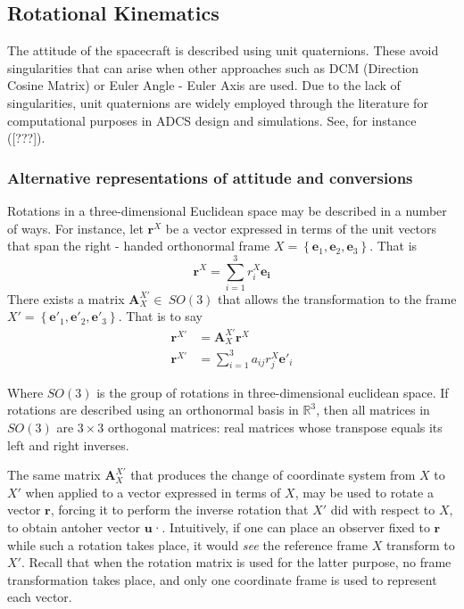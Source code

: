 \subsection{Rotational Kinematics}

The attitude of the spacecraft is described using unit quaternions. These avoid singularities that can arise when other approaches such as DCM (Direction Cosine Matrix) or Euler Angle - Euler Axis are used. Due to the lack of singularities, unit quaternions are widely employed through the literature for computational purposes in ADCS design and simulations. See, for instance ([???]).

\subsubsection{Alternative representations of attitude and conversions}
Rotations in a three-dimensional Euclidean space may be described in a number of ways. For instance, let $\mathbf{r}^X$ be a vector expressed in terms of the unit vectors that span the right - handed orthonormal frame $X = \left\{\mathbf{e}_1, \mathbf{e}_2, \mathbf{e}_3 \right\}$. That is
\begin{equation}
\mathbf{r}^X = \sum_{i=1}^{3}r_i^X \mathbf{e_i}
\end{equation}
There exists a matrix $\mathbf{A}_X^{X'} \in\ SO(3)$ that allows the transformation to the frame {$X' = \left\{\mathbf{e}'_1, \mathbf{e}'_2, \mathbf{e}'_3 \right\}$}. That is to say
\begin{align}
\mathbf{r}^{X'} &= \mathbf{A}_X^{X'} \mathbf{r}^{X}\\
\mathbf{r}^{X'} &= \sum_{i=1}^{3} a_{ij} r_j^X \mathbf{e}'_i
\end{align}

Where $SO(3)$ is the group of rotations in three-dimensional euclidean space. If rotations are described using an orthonormal basis in $\mathbb{R}^3$, then all matrices in $SO(3)$ are $3\times 3$ orthogonal matrices: real matrices whose transpose equals its left and right inverses.

The same matrix $\mathbf{A}_X^{X'}$ that produces the change of coordinate system from $X$ to $X'$ when applied to a vector expressed in terms of $X$, may be used to rotate a vector $\mathbf{r}$, forcing it to perform the inverse rotation that $X'$ did with respect to $X$, to obtain antoher vector $\mathbf{u}$·. Intuitively, if one can place an observer fixed to $\mathbf{r}$ while such a rotation takes place, it would \textit{see} the reference frame $X$ transform to $X'$. Recall that when the rotation matrix is used for the latter purpose, no frame transformation takes place, and only one coordinate frame is used to represent each vector.

